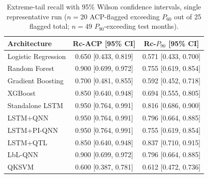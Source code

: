 \begin{table}[htbp]
\centering
\caption{Extreme-tail recall with 95\% Wilson confidence intervals, single representative run ($n=20$ ACP-flagged exceeding $P_{60}$ out of 25 flagged total; $n=49$ $P_{90}$-exceeding test months).}
\label{tab:recall_wilson_ci}
\begin{tabular}{lcc}
\toprule
\textbf{Architecture} & \textbf{Rc-ACP [95\% CI]} & \textbf{Rc-$P_{90}$ [95\% CI]} \\
\midrule
Logistic Regression & 0.650 [0.433, 0.819] & 0.571 [0.433, 0.700] \\
Random Forest & 0.900 [0.699, 0.972] & 0.755 [0.619, 0.854] \\
Gradient Boosting & 0.700 [0.481, 0.855] & 0.592 [0.452, 0.718] \\
XGBoost & 0.850 [0.640, 0.948] & 0.694 [0.555, 0.805] \\
Standalone LSTM & 0.950 [0.764, 0.991] & 0.816 [0.686, 0.900] \\
LSTM+QNN & 0.950 [0.764, 0.991] & 0.796 [0.664, 0.885] \\
LSTM+PI-QNN & 0.950 [0.764, 0.991] & 0.755 [0.619, 0.854] \\
LSTM+QTL & 0.850 [0.640, 0.948] & 0.837 [0.710, 0.915] \\
LbL-QNN & 0.900 [0.699, 0.972] & 0.796 [0.664, 0.885] \\
QKSVM & 0.600 [0.387, 0.781] & 0.612 [0.472, 0.736] \\
\bottomrule
\end{tabular}
\end{table}